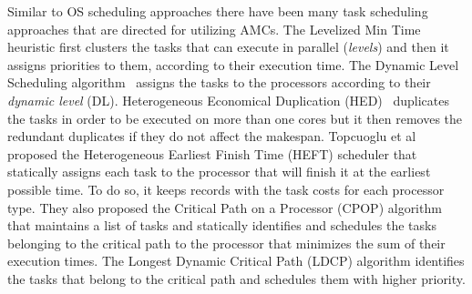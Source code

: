 Similar to OS scheduling approaches there have been many task scheduling approaches that are directed for utilizing AMCs.
The Levelized Min Time~\cite{Hetero95} heuristic first clusters the tasks that can execute in parallel (\textit{levels}) and then it assigns priorities to them, according to their execution time.
The Dynamic Level Scheduling algorithm~\cite{Hetero93} assigns the tasks to the processors according to their \textit{dynamic level} (DL).
Heterogeneous Economical Duplication (HED)~\cite{Dup09} duplicates the tasks in order to be executed on more than one cores but it then
removes the redundant duplicates if they do not affect the makespan. 
%
%
Topcuoglu et al proposed the Heterogeneous Earliest Finish Time (HEFT) scheduler that statically assigns each task to the processor that will finish it at the earliest possible time. To do so, it keeps records with the task costs for each processor type.
They also proposed the Critical Path on a Processor (CPOP) algorithm \cite{HEFT} that maintains a list of tasks and statically identifies and schedules the tasks belonging to the critical path  to the processor that minimizes the sum of their execution times. 
The Longest Dynamic Critical Path (LDCP) algorithm \cite{LDCP} identifies the tasks that belong to the critical path and schedules them with higher priority.

